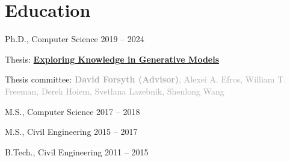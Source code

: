\section{Education}
\par
\begin{list1}
\item[] Ph.D., Computer Science \hfill{\color{muted}2019 -- 2024}
\item[] {Thesis:} \textbf{\textcolor{darkgray}{\href{https://www.ideals.illinois.edu/items/131447}{Exploring Knowledge in Generative Models}}}
\item[] {Thesis committee:} \textcolor{darkgray}{\textbf{David Forsyth (Advisor)}, Alexei A. Efros, William T. Freeman,
 Derek Hoiem, Svetlana Lazebnik, Shenlong Wang}   \hfill {}
\item[] M.S., Computer Science \hfill{\color{muted}2017 -- 2018}
\item[] M.S., Civil Engineering \hfill{\color{muted}2015 -- 2017}
\end{list1}
\vspace{1.6ex}
\par
\begin{list1}
\item[] B.Tech., Civil Engineering \hfill{\color{muted}2011 -- 2015}
\end{list1}
